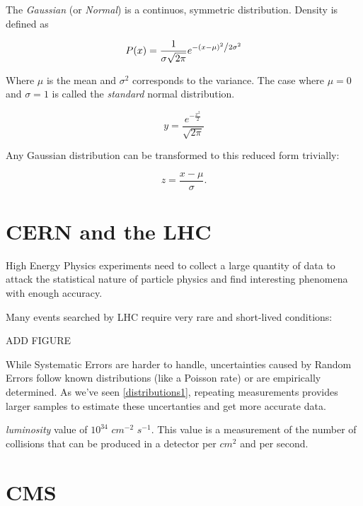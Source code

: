 The \textit{Gaussian} (or \textit{Normal}) is a continuos, symmetric distribution. Density is defined as

\begin{equation}
	P(x) = \frac{1}{{\sigma \sqrt {2\pi } }}e^{{{ - \left( {x - \mu } \right)^2 } \mathord{\left/ {\vphantom {{ - \left( {x - \mu } \right)^2 } {2\sigma ^2 }}} \right. \kern-\nulldelimiterspace} {2\sigma ^2 }}}
\end{equation}

Where $\mu$ is the mean and $\sigma ^2$ corresponds to the variance. The case where $\mu = 0$ and $\sigma = 1$ is called the \textit{standard} normal distribution.

\begin{equation}
	y = \frac{e^{ - \frac{{x^2 }}{2}}}{{\sqrt {2\pi } }}
\end{equation}

Any Gaussian distribution can be transformed to this reduced form trivially:

\begin{equation}
	z = \frac{x-\mu}{\sigma}.
\end{equation}

\section{CERN and the LHC}

High Energy Physics experiments need to collect a large quantity of data to attack the statistical nature of particle physics and find interesting phenomena with enough accuracy.

Many events searched by LHC require very rare and short-lived conditions:

ADD FIGURE

While Systematic Errors are harder to handle, uncertainties caused by Random Errors follow known distributions (like a Poisson rate) or are empirically determined. As we've seen \ref{distributions1}, repeating measurements provides larger samples to estimate these uncertanties and get more accurate data.

\textit{luminosity} value of $10^{34}$ $cm^{-2}$ $s^{-1}$. This value is a measurement of the number of collisions that can be produced in a detector per $cm^2$ and per second.

\section{CMS}

